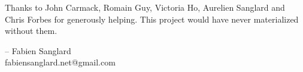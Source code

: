 Thanks to John Carmack, Romain Guy, Victoria Ho, Aurelien Sanglard and Chris Forbes for generously helping. This project would have never
materialized without them.\\ 
\par
-- Fabien Sanglard\\
fabiensanglard.net@gmail.com
